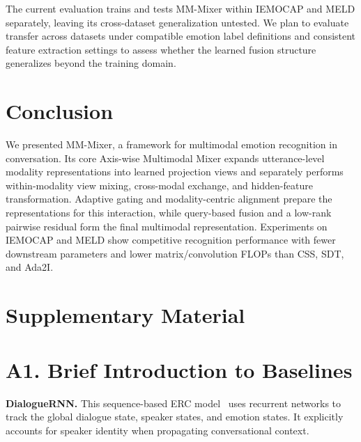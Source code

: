 \documentclass[letterpaper]{article} %
\begin{document}
The current evaluation trains and tests MM-Mixer within IEMOCAP and
MELD separately, leaving its cross-dataset generalization untested.
We plan to evaluate transfer across datasets under compatible emotion
label definitions and consistent feature extraction settings to assess
whether the learned fusion structure generalizes beyond the training
domain.

\section{Conclusion}

We presented MM-Mixer, a framework for multimodal emotion recognition
in conversation. Its core Axis-wise Multimodal Mixer expands
utterance-level modality representations into learned projection views
and separately performs within-modality view mixing, cross-modal
exchange, and hidden-feature transformation. Adaptive gating and
modality-centric alignment prepare the representations for this
interaction, while query-based fusion and a low-rank pairwise residual
form the final multimodal representation. Experiments on IEMOCAP and
MELD show competitive recognition performance with fewer downstream
parameters and lower matrix/convolution FLOPs than CSS, SDT, and Ada2I.





\FloatBarrier
\appendix
\section*{Supplementary Material}

\section{A1. Brief Introduction to Baselines}

\noindent\textbf{DialogueRNN.}
This sequence-based ERC model~\cite{dialoguernn} uses
recurrent networks to track the global dialogue state, speaker states,
and emotion states. It explicitly accounts for speaker identity when
propagating conversational context.
\end{document}
